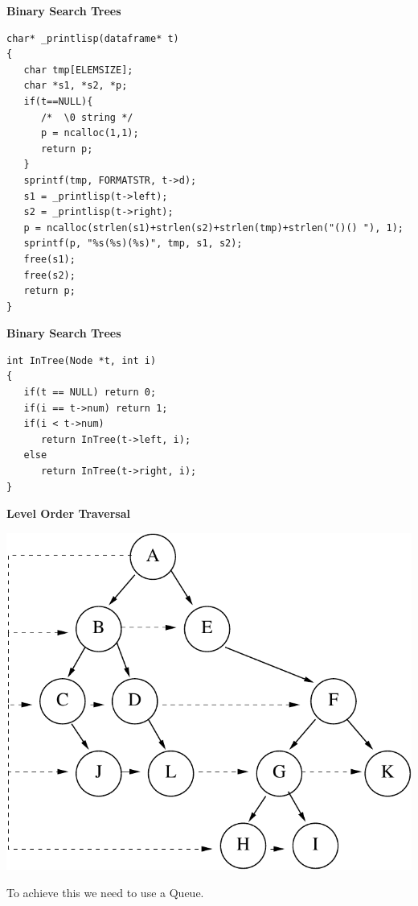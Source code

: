 \newpage	
{\samepage	
\begin{center}	
{\Large{\bf Binary Search Trees}}	
\end{center}	
{\small	
\begin{verbatim}	
char* _printlisp(dataframe* t)	
{	
   char tmp[ELEMSIZE];	
   char *s1, *s2, *p;	
   if(t==NULL){	
      /*  \0 string */	
      p = ncalloc(1,1);	
      return p;	
   }	
   sprintf(tmp, FORMATSTR, t->d);	
   s1 = _printlisp(t->left);	
   s2 = _printlisp(t->right);	
   p = ncalloc(strlen(s1)+strlen(s2)+strlen(tmp)+strlen("()() "), 1);	
   sprintf(p, "%s(%s)(%s)", tmp, s1, s2);	
   free(s1);	
   free(s2);	
   return p;	
}	
\end{verbatim}	
}	

\newpage	
{\samepage	
\begin{center}	
{\Large{\bf Binary Search Trees}}	
\end{center}	
\begin{verbatim}	
int InTree(Node *t, int i)	
{	
   if(t == NULL) return 0;	
   if(i == t->num) return 1;	
   if(i < t->num)	
      return InTree(t->left, i);	
   else	
      return InTree(t->right, i);	
}	
\end{verbatim}	
}	

\newpage	
{\samepage	
\begin{center}	
{\Large{\bf Level Order Traversal}}	
\end{center}	
\begin{center}	
\includegraphics{../Images/treelvl.pdf}	
\end{center}	
To achieve this we need to use a Queue.	
}	

}
